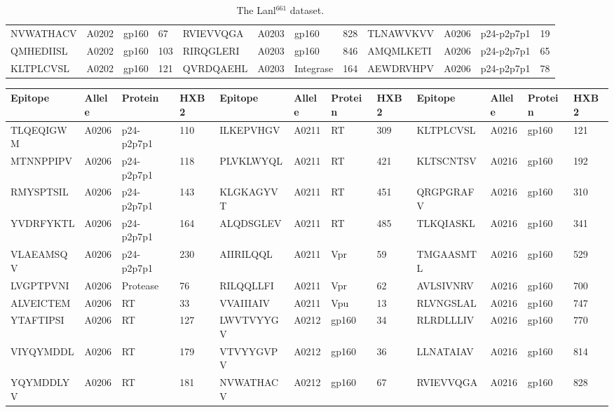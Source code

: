 \begin{table}[htp]
\begin{center}
\begin{sideways}
{\begin{tabulary}{1.5\textwidth}{|l|l|l|l|l|l|l|l|l|l|l|l|}
NVWATHACV & A0202 & gp160 & 67 & RVIEVVQGA & A0203 & gp160 & 828 & TLNAWVKVV & A0206 & p24-p2p7p1 & 19 \\
QMHEDIISL & A0202 & gp160 & 103 & RIRQGLERI & A0203 & gp160 & 846 & AMQMLKETI & A0206 & p24-p2p7p1 & 65 \\
KLTPLCVSL & A0202 & gp160 & 121 & QVRDQAEHL & A0203 & Integrase & 164 & AEWDRVHPV & A0206 & p24-p2p7p1 & 78 \bigstrut[b] \\
\hline
\end{tabulary}
}
\end{sideways}
\end{center}
\caption[The Lanl$^{661}$ dataset]{The Lanl$^{661}$ dataset.}\label{appendixa/table3}
\end{table}

\begin{table}[htp]
\begin{center}
\begin{sideways}
{
\tiny
\begin{tabulary}{1.5\textwidth}{|l|l|l|l|l|l|l|l|l|l|l|l|}
\hline
Epitope & Allele & Protein & HXB2 & Epitope & Allele & Protein & HXB2 & Epitope & Allele & Protein & HXB2 \bigstrut \\
\hline
TLQEQIGWM & A0206 & p24-p2p7p1 & 110 & ILKEPVHGV & A0211 & RT & 309 & KLTPLCVSL & A0216 & gp160 & 121 \bigstrut[t] \\
MTNNPPIPV & A0206 & p24-p2p7p1 & 118 & PLVKLWYQL & A0211 & RT & 421 & KLTSCNTSV & A0216 & gp160 & 192 \\
RMYSPTSIL & A0206 & p24-p2p7p1 & 143 & KLGKAGYVT & A0211 & RT & 451 & QRGPGRAFV & A0216 & gp160 & 310 \\
YVDRFYKTL & A0206 & p24-p2p7p1 & 164 & ALQDSGLEV & A0211 & RT & 485 & TLKQIASKL & A0216 & gp160 & 341 \\
VLAEAMSQV & A0206 & p24-p2p7p1 & 230 & AIIRILQQL & A0211 & Vpr & 59 & TMGAASMTL & A0216 & gp160 & 529 \\
LVGPTPVNI & A0206 & Protease & 76 & RILQQLLFI & A0211 & Vpr & 62 & AVLSIVNRV & A0216 & gp160 & 700 \\
ALVEICTEM & A0206 & RT & 33 & VVAIIIAIV & A0211 & Vpu & 13 & RLVNGSLAL & A0216 & gp160 & 747 \\
YTAFTIPSI & A0206 & RT & 127 & LWVTVYYGV & A0212 & gp160 & 34 & RLRDLLLIV & A0216 & gp160 & 770 \\
VIYQYMDDL & A0206 & RT & 179 & VTVYYGVPV & A0212 & gp160 & 36 & LLNATAIAV & A0216 & gp160 & 814 \\
YQYMDDLYV & A0206 & RT & 181 & NVWATHACV & A0212 & gp160 & 67 & RVIEVVQGA & A0216 & gp160 & 828 \\

\end{tabulary}}
\end{sideways}
\end{center}
\end{table}
